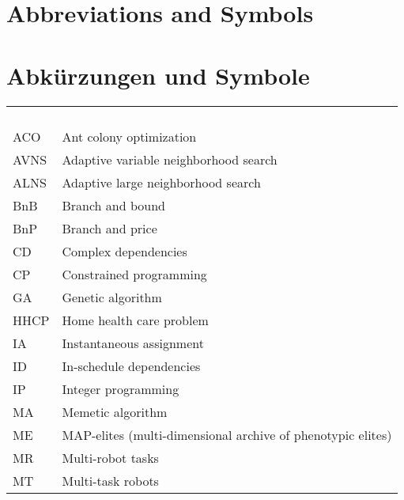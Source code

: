 
	{%
		\chapter*{Abbreviations and Symbols}\label{symbol}
	}
	{%
		\chapter*{Abkürzungen und Symbole}\label{symbol}
	}


\begin{supertabular*}{\textwidth}{ll}
 \\
\\
\hline 
{\bf {}}				&		{\bf {}} \\
\hline
\\ 	
ACO							& 	Ant colony optimization \\
AVNS						& 	Adaptive variable neighborhood search \\
ALNS						& 	Adaptive large neighborhood search \\
BnB							& 	Branch and bound \\
BnP							& 	Branch and price \\
CD							&   Complex dependencies \\
CP							& 	Constrained programming \\
GA							& 	Genetic algorithm \\
HHCP						& 	Home health care problem \\
IA							&   Instantaneous assignment \\
ID							&   In-schedule dependencies \\
IP							& 	Integer programming \\
MA							& 	Memetic algorithm \\
ME							&	MAP-elites (multi-dimensional archive of phenotypic elites) \\
MR							&   Multi-robot tasks \\
MT							&   Multi-task robots \\

\end{supertabular*}
